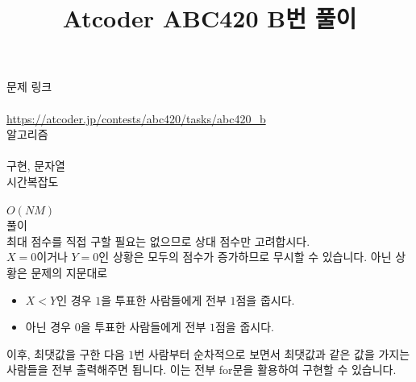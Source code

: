 \documentclass{article}
\title{Atcoder ABC420 B번 풀이}
\begin{document}



\hypersetup{
    colorlinks=true,
    linkcolor=blue,
    filecolor=magenta,      
    urlcolor=cyan,
}

\maketitle

\noindent 문제 링크\\\\
\href{https://atcoder.jp/contests/abc420/tasks/abc420_b}{https://atcoder.jp/contests/abc420/tasks/abc420\_b}\\

\noindent 알고리즘\\\\
구현, 문자열\\

\noindent 시간복잡도\\\\
$O(NM)$\\

\noindent 풀이\\

\noindent 최대 점수를 직접 구할 필요는 없으므로 상대 점수만 고려합시다.\\
$X = 0$이거나 $Y = 0$인 상황은 모두의 점수가 증가하므로 무시할 수 있습니다. 아닌 상황은 문제의 지문대로

\begin{itemize}
    \item $X < Y$인 경우 $1$을 투표한 사람들에게 전부 $1$점을 줍시다.
    \item 아닌 경우 $0$을 투표한 사람들에게 전부 $1$점을 줍시다.
\end{itemize}

\noindent 이후, 최댓값을 구한 다음 $1$번 사람부터 순차적으로 보면서 최댓값과 같은 값을 가지는 사람들을 전부 출력해주면 됩니다. 이는 전부 for문을 활용하여 구현할 수 있습니다.
\end{document}

